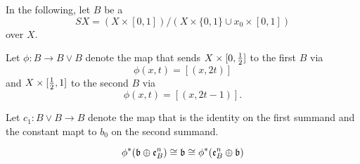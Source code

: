 \begin{myparagraph}
    In the following, let $B$ be a 
    \[ SX = (X \times [0, 1]) / (X \times \{ 0, 1 \} \cup x_0 \times [0, 1])\]
    over $X$.

    Let $\phi: B \to B \vee B$ denote the map that sends
    $X \times [0, \frac{1}{2}]$ to the first $B$ via
    \[ \phi(x, t) = [(x, 2t)] \]
    and $X \times [\frac{1}{2}, 1]$ to the second $B$ via
    \[ \phi(x, t) = [(x, 2t - 1)]. \]

    Let $c_1: B \vee B \to B$ denote the map that is the identity on the first summand
    and the constant mapt to $b_0$ on the second summand.
\end{myparagraph}

\begin{mylemma}\label{suspension::lemma1}
    \[ \phi^*(\mathfrak{b} \oplus \mathfrak{e}^n_B) \cong \mathfrak{b} \cong \phi^*(\mathfrak{e}^n_B \oplus \mathfrak{b}) \]
\end{mylemma}